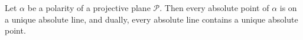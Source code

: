 Let $\alpha$ be a polarity of a projective plane $\mathcal{P}$. Then every absolute point of $\alpha$ is on a unique absolute line, and dually, every absolute line contains a unique absolute point.
